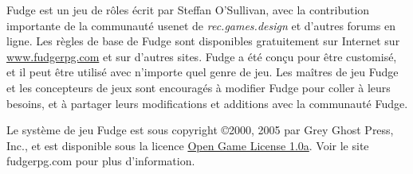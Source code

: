 \documentclass{article}
\newcommand{\mysection}[1]{
\vspace{0.2cm}
\noindent{\large \textbf{#1}}
}
\begin{document}
\begin{multicols*}{3}
\mysection{Licence}

Fudge est un jeu de rôles écrit par Steffan O’Sullivan, avec la contribution importante de la communauté usenet de \textit{rec.games.design} et d'autres forums en ligne. Les règles de base de Fudge sont disponibles gratuitement sur Internet sur \href{https://www.fudgerpg.com}{www.fudgerpg.com} et sur d'autres sites. Fudge a été conçu pour être customisé, et il peut être utilisé avec n'importe quel genre de jeu. Les maîtres de jeu Fudge et les concepteurs de jeux sont encouragés à modifier Fudge pour coller à leurs besoins, et à partager leurs modifications et additions avec la communauté Fudge.

Le système de jeu Fudge est sous copyright ©2000, 2005 par Grey Ghost Press, Inc., et est disponible sous la licence \href{https://web.archive.org/web/20160302062643/http://www.wizards.com/d20/files/OGLv1.0a.rtf}{Open Game License 1.0a}. Voir le site fudgerpg.com pour plus d'information.
\end{multicols*}
\end{document}
